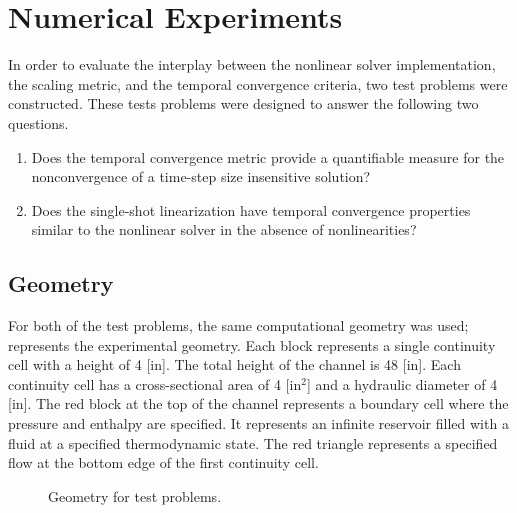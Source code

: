 \section{Numerical Experiments}
\label{sect:numerical_experiments}

In order to evaluate the interplay between the nonlinear solver implementation, the scaling metric, and the temporal convergence criteria, two test problems were constructed.
These tests problems were designed to answer the following two questions.

\begin{enumerate}
\item{Does the temporal convergence metric provide a quantifiable measure for the nonconvergence of a time-step size insensitive solution?}
\item{Does the single-shot linearization have temporal convergence properties similar to the nonlinear solver in the absence of nonlinearities?}
\end{enumerate}

\subsection{Geometry}
\label{subsect:experimental_geometry}
For both of the test problems, the same computational geometry was used;   represents the experimental geometry.
Each block represents a single continuity cell with a height of 4 [in].
The total height of the channel is 48 [in].
Each continuity cell has a cross-sectional area of 4 [in$^2$] and a hydraulic diameter of 4 [in].
The red block at the top of the channel represents a boundary cell where the pressure and enthalpy are specified.
It represents an infinite reservoir filled with a fluid at a specified thermodynamic state.
The red triangle represents a specified flow at the bottom edge of the first continuity cell. 

\begin{figure}[h!t]
\begin{center}
\end{center}
\caption{Geometry for test problems.}
\label{fig:exp_geometry}
\end{figure}

